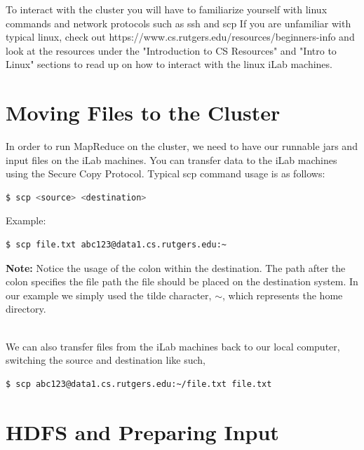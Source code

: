 \documentclass{article}
\begin{document}
\begin{info}
To interact with the cluster you will have to familiarize yourself with linux commands and network protocols such as ssh and scp If you are unfamiliar with typical linux, check out https://www.cs.rutgers.edu/resources/beginners-info and look at the resources under the "Introduction to CS Resources" and "Intro to Linux" sections to read up on how to interact with the linux iLab machines.
\end{info}



\section{Moving Files to the Cluster}
In order to run MapReduce on the cluster, we need to have our runnable jars and input files on the iLab machines. You can transfer data to the iLab machines using the Secure Copy Protocol. 
Typical scp command usage is as follows:
\begin{lstlisting}[language=bash]
  $ scp <source> <destination>
\end{lstlisting}
Example:
\begin{lstlisting}[language=bash]
  $ scp file.txt abc123@data1.cs.rutgers.edu:~
\end{lstlisting}
\textbf{Note:} Notice the usage of the colon within the destination. The path after the colon specifies the file path the file should be placed on the destination system. In our example we simply used the tilde character, $\sim$, which represents the home directory.

\-\ \\We can also transfer files from the iLab machines back to our local computer, switching the source and destination like such,
\begin{lstlisting}[language=bash]
  $ scp abc123@data1.cs.rutgers.edu:~/file.txt file.txt
\end{lstlisting}


\section{HDFS and Preparing Input}
\end{document}
